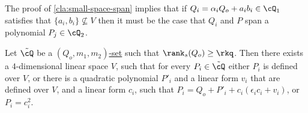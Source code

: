 \begin{remark}\label{rem:QnotV}
The proof of  \autoref{cla:small-space-span} implies that if $Q_i=\alpha_iQ_o+a_ib_i \in \cQ_1$ satisfies that $\{a_i,b_i\}\not\subseteq V$ then
it must be the case that $Q_i$ and $P$ span a polynomial $P_j \in \cQ_2$. 
\end{remark}


\begin{claim}\label{cla:V-map-Q-dom}
Let $\tilde{\cQ}$ be a \hyperref[def:Q-dom]{$(Q_o,m_1,m_2)$-set} such that $\rank_s(Q_o)\geq \rkq$. 
Then there exists a $4$-dimensional linear space $V$, 
such that for every $P_i\in \tilde{\cQ}$ either $P_i$ is defined over $V$, or there is a quadratic polynomial $P'_i$ and a linear form $v_i$ that are defined over $V$, and  a linear form $c_i$, such that $P_i = Q_o +P'_i + c_i(\epsilon_i c_i + v_i )$, or $P_i = c_i^2$. 
\end{claim}

